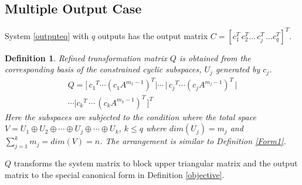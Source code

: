 \documentclass{elsarticle}
\newtheorem{Definition}{Definition}
\numberwithin{equation}{section}
\begin{document}
\subsection{Multiple Output Case}

System \eqref{outputeq} with $q$ outputs has the output matrix $C=\left[c^T_1\,c^T_2...\,c^T_j\,...c^T_q\right]^T$. \\

\begin{Definition}

Refined transformation matrix $Q$ is obtained from the corresponding basis of the constrained cyclic subspaces, $U_j$ generated by $c_j$. 
\begin{equation}\label{eq:o3}
	\begin{aligned}
	Q=[\,{c_1}^T \cdots ({c_1} {A^{m_{1}-1}})^T| \cdots\, |\,{c_j}^T\cdots ({c_j} 		{A^{m_{j}-1}})^T\,| \\ \cdots|{c_k}^T \,\cdots \,({c_k} {A^{m_{k}-1}})^T \,]^T
	\end{aligned}
\end{equation}
Here the subspaces are subjected to the condition where the total space $V = U_1 \oplus U_2 \oplus \cdots \oplus U_j \oplus \cdots \oplus U_k$, $k\leq q$ where $dim(U_j) = m_j$ and $\sum_{j=1}^{k}m_{j} = dim(V) = n$. The arrangement is similar to \textit{Definition} \ref{Form1}.

\end{Definition}

$Q$ transforms the system matrix to block upper triangular matrix and the output matrix to the special canonical form in Definition \ref{objective}.
\end{document}
